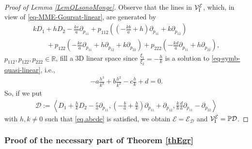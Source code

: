 \documentclass[10pt,a4paper]{amsart}
\newcommand{\D}{\mathcal{D}}
\newcommand{\MM}{\mathcal{V}_{\textrm{\normalfont I}}}
\newcommand{\E}{\mathcal{E}}
\newcommand{\Span}[1]{\left\langle #1 \right\rangle}
\renewcommand{\P}{\mathbb{P}}
\numberwithin{equation}{section}
\begin{document}
\begin{proof}[Proof of Lemma \ref{LemQLsonoMonge}]
Observe that the lines in $\MM^\E$, which, in view of \eqref{eq-MME-Goursat-linear}, are generated by
\begin{gather*}
 kD_1+hD_2-\frac{ke}{a}\partial_{p_{11}}+
p_{112}\left(\left(-\frac{kb}{a}+h\right)\partial_{p_{11}}+k\partial_{p_{12}}\right) \\
\qquad {} + p_{122}\left(-\frac{kc}{a}\partial_{p_{11}}+h\partial_{p_{12}}+k\partial_{p_{22}}\right)
+p_{222}\left(-\frac{kd}{a}\partial_{p_{11}}+h\partial_{p_{22}}\right),
\end{gather*}
$p_{112},p_{122},p_{222}\in\mathbb{R}$,
f\/ill a 3D linear space since $\frac{\xi_1}{\xi_2}=-\frac{h}{k}$ is a solution to \eqref{eq-symb-quasi-linear}, i.e.,
\begin{gather}\label{eq.abcde}
-a\frac{h^3}{k^3}+b\frac{h^2}{k^2}-c\frac{h}{k}+d=0.
\end{gather}
So, if we put
\begin{gather*}%
\D:= \Span{ D_1 + \frac{h}{k}D_2 - \frac{e}{a}\partial_{p_{11}}, \left(-\frac{b}{a}+\frac{h}{k}\right)\partial_{p_{11}}+\partial_{p_{12}}, \frac{k}{h}\frac{d}{a}\partial_{p_{11}}-\partial_{p_{22}}}
\end{gather*}
with $h,k\neq 0$ such that \eqref{eq.abcde} is satisf\/ied, we obtain $\E=\E_\D$ and $\MM^\E=\P\D$.
\end{proof}

\subsubsection{Proof of the necessary part of Theorem \ref{thEgr}}\label{subDimThEgrNec}
\end{document}
